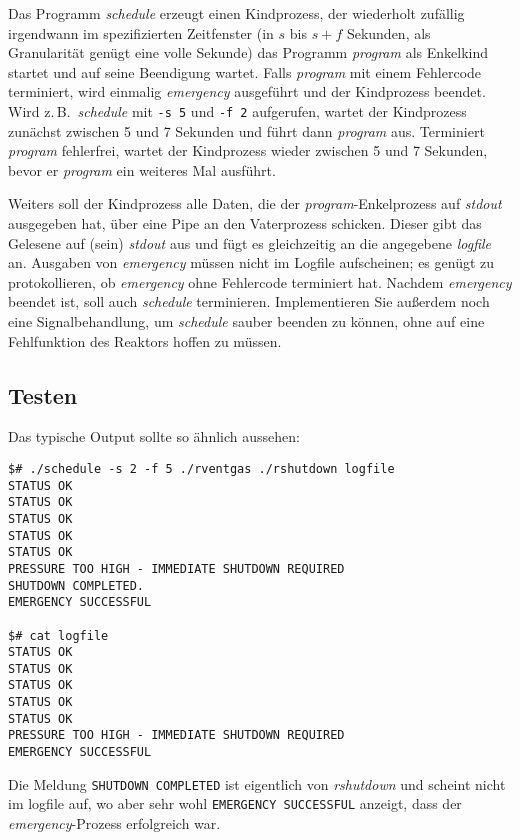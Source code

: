 \documentclass{article}
\begin{document}
Das Programm \emph{schedule} erzeugt einen Kindprozess, der wiederholt zufällig
irgendwann im spezifizierten Zeitfenster (in $s$ bis $s+f$ Sekunden, als
Granularität genügt eine volle Sekunde) das Programm \emph{program} als
Enkelkind startet und auf seine Beendigung wartet. Falls \emph{program} mit
einem Fehlercode terminiert, wird einmalig \emph{emergency} ausgeführt und der
Kindprozess beendet. Wird z.\,B.\ \emph{schedule} mit \verb_-s 5_ und
\verb_-f 2_ aufgerufen, wartet der Kindprozess zunächst zwischen 5 und 7
Sekunden und führt dann \emph{program} aus. Terminiert \emph{program}
fehlerfrei, wartet der Kindprozess wieder zwischen 5 und 7 Sekunden, bevor er
\emph{program} ein weiteres Mal ausführt.

Weiters soll der Kindprozess alle Daten, die der \emph{program}-Enkelprozess auf
\emph{stdout} ausgegeben hat, über eine Pipe an den Vaterprozess schicken.
Dieser gibt das Gelesene auf (sein) \emph{stdout} aus und fügt es gleichzeitig
an die angegebene \emph{logfile} an. Ausgaben von \emph{emergency} müssen nicht
im Logfile aufscheinen; es genügt zu protokollieren, ob \emph{emergency} ohne
Fehlercode terminiert hat. Nachdem \emph{emergency} beendet ist, soll auch
\emph{schedule} terminieren. Implementieren Sie außerdem noch eine
Signalbehandlung, um \emph{schedule} sauber beenden zu können, ohne auf eine
Fehlfunktion des Reaktors hoffen zu müssen.

\subsection*{Testen}

Das typische Output sollte so ähnlich aussehen:
\begin{verbatim}
$# ./schedule -s 2 -f 5 ./rventgas ./rshutdown logfile
STATUS OK
STATUS OK
STATUS OK
STATUS OK
STATUS OK
PRESSURE TOO HIGH - IMMEDIATE SHUTDOWN REQUIRED
SHUTDOWN COMPLETED.
EMERGENCY SUCCESSFUL

$# cat logfile
STATUS OK
STATUS OK
STATUS OK
STATUS OK
STATUS OK
PRESSURE TOO HIGH - IMMEDIATE SHUTDOWN REQUIRED
EMERGENCY SUCCESSFUL
\end{verbatim}
Die Meldung \verb_SHUTDOWN COMPLETED_ ist eigentlich von \emph{rshutdown} und
scheint nicht im logfile auf, wo aber sehr wohl \verb_EMERGENCY SUCCESSFUL_
anzeigt, dass der \emph{emergency}-Prozess erfolgreich war.
\end{document}
